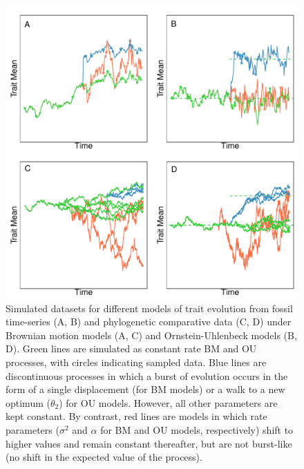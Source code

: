 \begin{figure}[p]
\centering
\includegraphics[width=\textwidth]{figs/Pennell_TREE-fig-box1}
\caption[Trait data simulated under alternative models]{Simulated datasets for different models of trait evolution from fossil time-series (A, B) and phylogenetic comparative data (C, D) under Brownian motion models (A, C) and Ornstein-Uhlenbeck models (B, D). Green lines are simulated as constant rate BM and OU processes, with circles indicating sampled data. Blue lines are discontinuous processes in which a burst of evolution occurs in the form of a single displacement (for BM models) or a walk to a new optimum ($\theta_2$) for OU models. However, all other parameters are kept constant. By contrast, red lines are models in which rate parameters ($\sigma^2$ and $\alpha$ for BM and OU models, respectively) shift to higher values and remain constant thereafter, but are not burst-like (no shift in the expected value of the process).  
}
\label{fig:pe-box1}
\end{figure}

